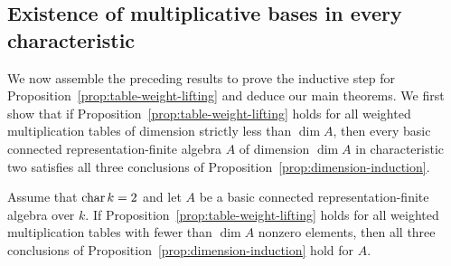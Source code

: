 \subsection{Existence of multiplicative bases in every characteristic}
\label{subsec:main-theorems}

We now assemble the preceding results to prove the inductive step for Proposition~\ref{prop:table-weight-lifting} and deduce our main theorems. We first show that if Proposition~\ref{prop:table-weight-lifting} holds for all weighted multiplication tables of dimension strictly less than $\dim A$, then every basic connected representation-finite algebra $A$ of dimension $\dim A$ in characteristic two satisfies all three conclusions of Proposition~\ref{prop:dimension-induction}.

\begin{lemma}
\label{lem:recovery-with-lifting}
Assume that $\operatorname{char} k=2$ and let $A$ be a basic connected representation-finite algebra over $k$. If Proposition~\ref{prop:table-weight-lifting} holds for all weighted multiplication tables with fewer than $\dim A$ nonzero elements, then all three conclusions of Proposition~\ref{prop:dimension-induction} hold for $A$.
\end{lemma}
